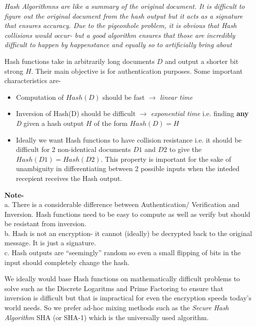 \begin{mdframed}
		\centering \emph{Hash Algorithmns are like a summary of the original document. It is difficult to figure out the original document from the hash output but it acts as a signature that ensures accuracy. Due to the pigeonhole problem, it is obvious that Hash collisions would occur- but a good algorithm ensures that those are incredibly difficult to happen by happenstance and equally so to artificially bring about \\ }\par
		
		\raggedright Hash functions take in arbitrarily long documents \(D\) and output a shorter bit strong \(H\). Their main objective is for authentication purposes. Some important characteristics are-
		\begin{itemize}
			\item Computation of $Hash(D)$ should be fast \(\rightarrow\) \emph{linear time}
			\item Inversion of Hash(D) should be difficult \(\rightarrow \) \emph{exponential time} i.e. finding \textbf{any} \emph{D} given a hash output \(H\) of the form \(Hash(D) = H\)
			\item Ideally we want Hash functions to have collision resistance i.e. it should be difficult for 2 non-identical documents \(D1\) and \(D2\) to give the \(Hash(D1)= Hash(D2)\). This property is important for the sake of unambiguity in differentiating between 2 possible inputs when the inteded recepient receives the Hash output.
		\end{itemize}
		\textbf{Note-} \\
		\quad a. There is a considerable difference between Authentication/ Verification and Inversion. Hash functions need to be easy to compute as well as verify but should be resistant from inversion. \\
		\quad b. Hash is not an encryption- it cannot (ideally) be decrypted back to the original message. It is just a signature.\\
		\quad c. Hash outputs are ``seemingly'' random so even a small flipping of bits in the input should completely change the hash. \par

		We ideally would base Hash functions on mathematically difficult problems to solve such as the Discrete Logaritms and Prime Factoring to ensure that inversion is difficult but that is impractical for even the encryption speeds today's world needs. So we prefer ad-hoc mixing methods such as the \emph{Secure Hash Algorithm} {SHA (or SHA-1)}  which is the universally used algorithm. 

\end{mdframed}
